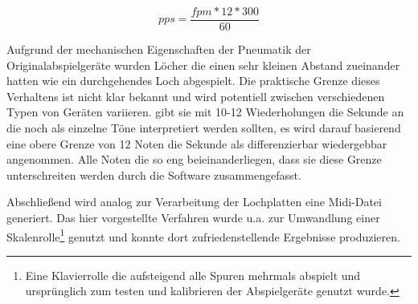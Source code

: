 \begin{equation} \label{eq:1}
    pps = \frac{fpm * 12 * 300}{60}
\end{equation}

Aufgrund der mechanischen Eigenschaften der Pneumatik der Originalabspielgeräte wurden Löcher die einen sehr kleinen Abstand zueinander hatten wie ein durchgehendes Loch abgespielt.
Die praktische Grenze dieses Verhaltens ist nicht klar bekannt und wird potentiell zwischen verschiedenen Typen von Geräten variieren.
\textcite[7]{zoltan_1994} gibt sie mit 10-12 Wiederholungen die Sekunde an die noch als einzelne Töne interpretiert werden sollten, es wird darauf basierend eine obere Grenze von 12 Noten die Sekunde als differenzierbar wiedergebbar angenommen.
Alle Noten die so eng beieinanderliegen, dass sie diese Grenze unterschreiten werden durch die Software zusammengefasst.

Abschließend wird analog zur Verarbeitung der Lochplatten eine Midi-Datei generiert.
Das hier vorgestellte Verfahren wurde u.a. zur Umwandlung einer Skalenrolle\footnote{Eine Klavierrolle die aufsteigend alle Spuren mehrmals abspielt und ursprünglich zum testen und kalibrieren der Abspielgeräte genutzt wurde.} genutzt und konnte dort zufriedenstellende Ergebnisse produzieren.
